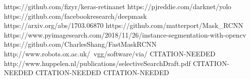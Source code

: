 \begin{thebibliography}{20}%



 https://github.com/fizyr/keras-retinanet
 https://pjreddie.com/darknet/yolo
 https://github.com/facebookresearch/deepmask
 https://arxiv.org/abs/1703.06870
 https://github.com/matterport/Mask\_RCNN
 https://www.pyimagesearch.com/2018/11/26/instance-segmentation-with-opencv
 https://github.com/CharlesShang/FastMaskRCNN
 http://www.robots.ox.ac.uk/~vgg/software/via/
 CITATION-NEEDED
 http://www.huppelen.nl/publications/selectiveSearchDraft.pdf
 CITATION-NEEDED
 CITATION-NEEDED
 CITATION-NEEDED

\end{thebibliography}

